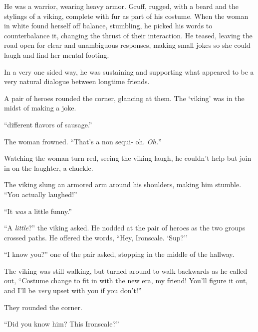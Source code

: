 He was a warrior, wearing heavy armor.  Gruff, rugged, with a beard and the stylings of a viking, complete with fur as part of his costume.  When the woman in white found herself off balance, stumbling, he picked his words to counterbalance it, changing the thrust of their interaction.  He teased, leaving the road open for clear and unambiguous responses, making small jokes so she could laugh and find her mental footing.



In a very one sided way, he was sustaining and supporting what appeared to be a very natural dialogue between longtime friends.



A pair of heroes rounded the corner, glancing at them.  The `viking' was in the midst of making a joke.



``\ldotssix different flavors of sausage.''



The woman frowned.  ``That's a non sequi-  oh.  \emph{Oh.}''



Watching the woman turn red, seeing the viking laugh, he couldn't help but join in on the laughter, a chuckle.



The viking slung an armored arm around his shoulders, making him stumble.  ``You actually laughed!''



``It \emph{was} a little funny.''



``A \emph{little}?''  the viking asked.  He nodded at the pair of heroes as the two groups crossed paths.  He offered the words, ``Hey, Ironscale.  `Sup?''



``I know you?'' one of the pair asked, stopping in the middle of the hallway.



The viking was still walking, but turned around to walk backwards as he called out, ``Costume change to fit in with the new era, my friend!  You'll figure it out, and I'll be \emph{very} upset with you if you don't!''



They rounded the corner.



``Did you know him?  This Ironscale?''



